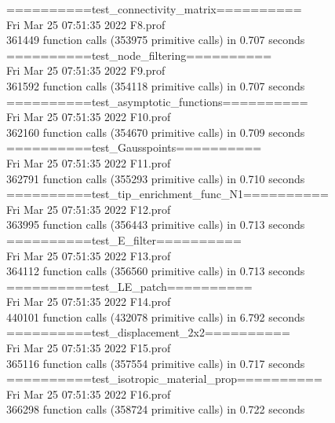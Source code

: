 \documentclass[fleqn, 12.5pt,a4paper]{report}
\newcommand\tab[1][1cm]{\hspace*{#1}}
\begin{document}
==========test{\_}connectivity{\_}matrix==========\\
Fri Mar 25 07:51:35 2022 \tab[1cm]   F8.prof\\
361449 function calls (353975 primitive calls) in 0.707 seconds\\

==========test{\_}node{\_}filtering==========\\
Fri Mar 25 07:51:35 2022 \tab[1cm]   F9.prof\\
361592 function calls (354118 primitive calls) in 0.707 seconds\\

==========test{\_}asymptotic{\_}functions==========\\
Fri Mar 25 07:51:35 2022 \tab[1cm]    F10.prof\\
362160 function calls (354670 primitive calls) in 0.709 seconds\\

==========test{\_}Gausspoints==========\\
Fri Mar 25 07:51:35 2022 \tab[1cm]   F11.prof\\
362791 function calls (355293 primitive calls) in 0.710 seconds\\

==========test{\_}tip{\_}enrichment{\_}func{\_}N1==========\\
Fri Mar 25 07:51:35 2022 \tab[1cm]   F12.prof\\
363995 function calls (356443 primitive calls) in 0.713 seconds\\

==========test{\_}E{\_}filter==========\\
Fri Mar 25 07:51:35 2022 \tab[1cm]    F13.prof\\
364112 function calls (356560 primitive calls) in 0.713 seconds\\

==========test{\_}LE{\_}patch==========\\
Fri Mar 25 07:51:35 2022 \tab[1cm]    F14.prof\\
440101 function calls (432078 primitive calls) in 6.792 seconds\\

==========test{\_}displacement{\_}2x2==========\\
Fri Mar 25 07:51:35 2022 \tab[1cm]   F15.prof\\
365116 function calls (357554 primitive calls) in 0.717 seconds\\

==========test{\_}isotropic{\_}material{\_}prop==========\\
Fri Mar 25 07:51:35 2022 \tab[1cm]    F16.prof\\
366298 function calls (358724 primitive calls) in 0.722 seconds\\
\end{document}
